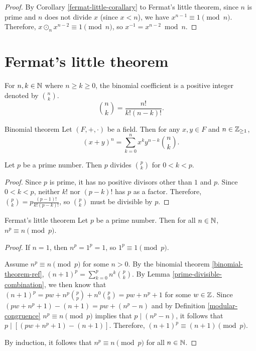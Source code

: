 \begin{proof}
    By Corollary \ref{fermat-little-corallary} to Fermat's little theorem, since $n$ is prime and $n$ does not divide $x$ (since $x < n$), we have $x^{n-1} \equiv 1 \pmod n$. Therefore, $x \odot_n x^{n-2} \equiv 1 \pmod n$, so $x^{-1} = x^{n-2} \bmod n$.
\end{proof}

\section{Fermat's little theorem}

\begin{defn}
    For $n, k \in \mathbb{N}$ where $n \geq k \geq 0$, the binomial coefficient is a positive integer denoted by $\binom{n}{k}$. \[\binom{n}{k} = \frac{n!}{k!(n-k)!}.\]
\end{defn}

\begin{thm}{Binomial theorem}\label{binomial-theorem-ref}\proofbreak
    Let $(F, +, \cdot)$ be a field. Then for any $x, y \in F$ and $n \in \mathbb{Z}_{\geq 1}$, \[\left(x + y\right)^n = \sum_{k=0}^n x^ky^{n-k}{\binom{n}{k}}.\]
\end{thm}

\begin{lemma}\label{prime-divisible-combination}
    Let $p$ be a prime number. Then $p$ divides $\binom{p}{k}$ for $0 < k < p$.
\end{lemma}

\begin{proof}
    Since $p$ is prime, it has no positive divisors other than $1$ and $p$. Since $0 < k < p$, neither $k!$ nor $(p-k)!$ has $p$ as a factor. Therefore, $\binom{p}{k} = p\frac{(p-1)!}{k!(p-k)!}$, so $\binom{p}{k}$ must be divisible by $p$.
\end{proof}

\begin{thm}{Fermat's little theorem}\label{fermat-little-theorem}\proofbreak
    Let $p$ be a prime number. Then for all $n \in \mathbb{N}$, $n^p \equiv n \pmod p$.
\end{thm}

\begin{proof}
    If $n = 1$, then $n^p = 1^p = 1$, so $1^p \equiv 1 \pmod p$.

    Assume $n^p \equiv n \pmod p$ for some $n > 0$. By the binomial theorem \ref{binomial-theorem-ref}, $(n+1)^p = \sum_{k=0}^pn^k\binom{p}{k}$. By Lemma \ref{prime-divisible-combination}, we then know that $(n+1)^p = pw + n^p\binom{p}{p} + n^0\binom{p}{0} = pw + n^p + 1$ for some $w \in \mathbb{Z}$. Since $(pw + n^p + 1) - (n + 1) = pw + (n^p - n)$ and by Definition \ref{modular-congruence} $n^p \equiv n \pmod p$ implies that $p \mid (n^p - n)$, it follows that $p \mid \left[(pw + n^p + 1) - (n + 1)\right]$. Therefore, $(n+1)^p \equiv (n+1) \pmod p$.

    By induction, it follows that $n^p \equiv n \pmod p$ for all $n \in \mathbb{N}$.
\end{proof}

